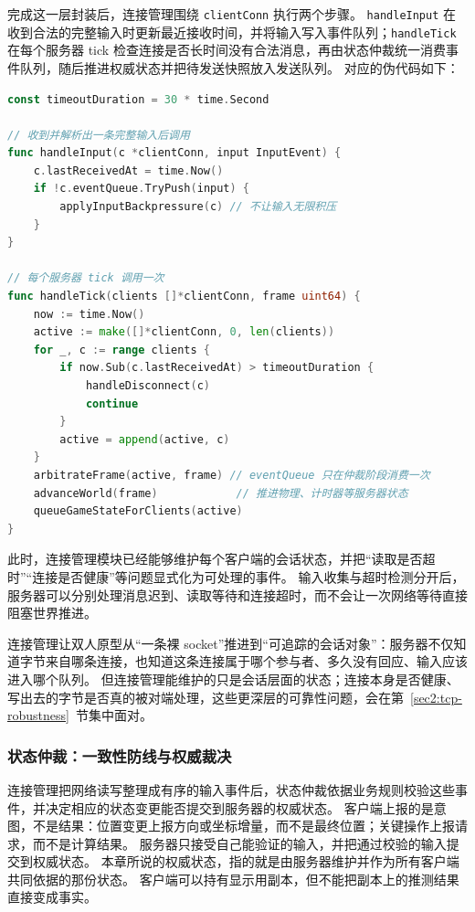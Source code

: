 完成这一层封装后，连接管理围绕 \texttt{clientConn} 执行两个步骤。
\texttt{handleInput} 在收到合法的完整输入时更新最近接收时间，并将输入写入事件队列；\texttt{handleTick} 在每个服务器 tick 检查连接是否长时间没有合法消息，再由状态仲裁统一消费事件队列，随后推进权威状态并把待发送快照放入发送队列。
对应的伪代码如下：

\begin{tcolorbox}[title=连接管理伪代码示例]
\begin{lstlisting}[style=codeblock, language=go]
const timeoutDuration = 30 * time.Second

// 收到并解析出一条完整输入后调用
func handleInput(c *clientConn, input InputEvent) {
    c.lastReceivedAt = time.Now()
    if !c.eventQueue.TryPush(input) {
        applyInputBackpressure(c) // 不让输入无限积压
    }
}

// 每个服务器 tick 调用一次
func handleTick(clients []*clientConn, frame uint64) {
    now := time.Now()
    active := make([]*clientConn, 0, len(clients))
    for _, c := range clients {
        if now.Sub(c.lastReceivedAt) > timeoutDuration {
            handleDisconnect(c)
            continue
        }
        active = append(active, c)
    }
    arbitrateFrame(active, frame) // eventQueue 只在仲裁阶段消费一次
    advanceWorld(frame)            // 推进物理、计时器等服务器状态
    queueGameStateForClients(active)
}
\end{lstlisting}
\end{tcolorbox}

此时，连接管理模块已经能够维护每个客户端的会话状态，并把“读取是否超时”“连接是否健康”等问题显式化为可处理的事件。
输入收集与超时检测分开后，服务器可以分别处理消息迟到、读取等待和连接超时，而不会让一次网络等待直接阻塞世界推进。

连接管理让双人原型从“一条裸 socket”推进到“可追踪的会话对象”：服务器不仅知道字节来自哪条连接，也知道这条连接属于哪个参与者、多久没有回应、输入应该进入哪个队列。
但连接管理能维护的只是会话层面的状态；连接本身是否健康、写出去的字节是否真的被对端处理，这些更深层的可靠性问题，会在第~\ref{sec2:tcp-robustness}~节集中面对。


\subsubsection{状态仲裁：一致性防线与权威裁决}\label{sec2:authoritative-arbitration}

连接管理把网络读写整理成有序的输入事件后，状态仲裁依据业务规则校验这些事件，并决定相应的状态变更能否提交到服务器的权威状态。
客户端上报的是意图，不是结果：位置变更上报方向或坐标增量，而不是最终位置；关键操作上报请求，而不是计算结果。
服务器只接受自己能验证的输入，并把通过校验的输入提交到权威状态。
本章所说的权威状态，指的就是由服务器维护并作为所有客户端共同依据的那份状态。
客户端可以持有显示用副本，但不能把副本上的推测结果直接变成事实。

